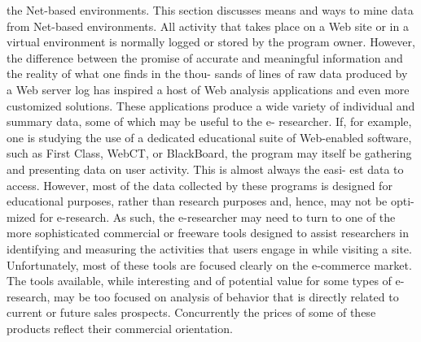 \documentclass[a4paper,12pt]{article}
\begin{document}
    
 \noindent     
 the Net-based environments. This section discusses means and ways to mine data from Net-based environments. All activity that takes place on a Web site or in a virtual environment is normally logged or stored by the program owner. However, the difference between the promise of accurate and meaningful information and the reality of what one finds in the thou- sands of lines of raw data produced by a Web server log has inspired a host of Web analysis applications and even more customized solutions. These applications produce a wide variety of individual and summary data, some of which may be useful to the e- researcher. If, for example, one is studying the use of a dedicated educational suite of Web-enabled software, such as First Class, WebCT, or BlackBoard, the program may itself be gathering and presenting data on user activity. This is almost always the easi- est data to access. However, most of the data collected by these programs is designed for educational purposes, rather than research purposes and, hence, may not be opti- mized for e-research. As such, the e-researcher may need to turn to one of the more sophisticated commercial or freeware tools designed to assist researchers in identifying and measuring the activities that users engage in while visiting a site. Unfortunately, most of these tools are focused clearly on the e-commerce market. The tools available, while interesting and of potential value for some types of e-research, may be too focused on analysis of behavior that is directly related to current or future sales prospects. Concurrently the prices of some of these products reflect their commercial orientation.
\end{document}
